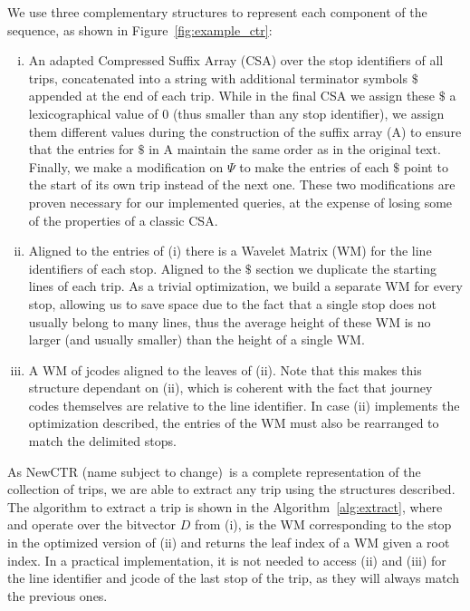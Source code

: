 \documentclass[runningheads]{llncs}
\newcommand{\ctr}{NewCTR (name subject to change)\ }
\begin{document}
We use three complementary structures to represent each component of the sequence, as shown in Figure~\ref{fig:example_ctr}:
\begin{enumerate}[(i)]
    \item An adapted Compressed Suffix Array (CSA) over the stop identifiers of all trips, concatenated into a string with additional terminator symbols $\$$ appended at the end of each trip. While in the final CSA we assign these $\$$ a lexicographical value of 0 (thus smaller than any stop identifier), we assign them different values during the construction of the suffix array (A) to ensure that the entries for $\$$ in A maintain the same order as in the original text. Finally, we make a modification on $\Psi$ to make the entries of each $\$$ point to the start of its own trip instead of the next one. These two modifications are proven necessary for our implemented queries, at the expense of losing some of the properties of a classic CSA.
    \item Aligned to the entries of (i) there is a Wavelet Matrix (WM) for the line identifiers of each stop. Aligned to the $\$$ section we duplicate the starting lines of each trip. As a trivial optimization, we build a separate WM for every stop, allowing us to save space due to the fact that a single stop does not usually belong to many lines, thus the average height of these WM is no larger (and usually smaller) than the height of a single WM.
    \item A WM of jcodes aligned to the leaves of (ii). Note that this makes this structure dependant on (ii), which is coherent with the fact that journey codes themselves are relative to the line identifier. In case (ii) implements the optimization described, the entries of the WM must also be rearranged to match the delimited stops.
\end{enumerate}

As \ctr is a complete representation of the collection of trips, we are able to extract any trip using the structures described.  The algorithm to extract a trip is shown in the Algorithm~\ref{alg:extract}, where  and  operate over the bitvector $D$ from (i),  is the WM corresponding to the stop  in the optimized version of (ii) and  returns the leaf index of a WM given a root index. In a practical implementation, it is not needed to access (ii) and (iii) for the line identifier and jcode of the last stop of the trip, as they will always match the previous ones.
\end{document}
